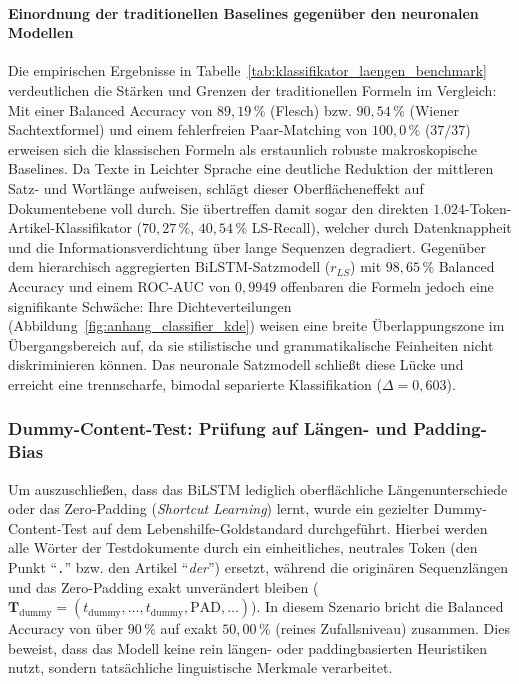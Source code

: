 \paragraph{Einordnung der traditionellen Baselines gegenüber den neuronalen Modellen}
Die empirischen Ergebnisse in Tabelle~\ref{tab:klassifikator_laengen_benchmark} verdeutlichen die Stärken und Grenzen der traditionellen Formeln im Vergleich: Mit einer Balanced Accuracy von $89{,}19\,\%$ (Flesch) bzw. $90{,}54\,\%$ (Wiener Sachtextformel) und einem fehlerfreien Paar-Matching von $100{,}0\,\%$ ($37/37$) erweisen sich die klassischen Formeln als erstaunlich robuste makroskopische Baselines. Da Texte in Leichter Sprache eine deutliche Reduktion der mittleren Satz- und Wortlänge aufweisen, schlägt dieser Oberflächeneffekt auf Dokumentebene voll durch. Sie übertreffen damit sogar den direkten $1.024$-Token-Artikel-Klassifikator ($70{,}27\,\%$, $40{,}54\,\%$ LS-Recall), welcher durch Datenknappheit und die Informationsverdichtung über lange Sequenzen degradiert.
Gegenüber dem hierarchisch aggregierten BiLSTM-Satzmodell ($r_{LS}$) mit $98{,}65\,\%$ Balanced Accuracy und einem ROC-AUC von $0{,}9949$ offenbaren die Formeln jedoch eine signifikante Schwäche: Ihre Dichteverteilungen (Abbildung~\ref{fig:anhang_classifier_kde}) weisen eine breite Überlappungszone im Übergangsbereich auf, da sie stilistische und grammatikalische Feinheiten nicht diskriminieren können. Das neuronale Satzmodell schließt diese Lücke und erreicht eine trennscharfe, bimodal separierte Klassifikation ($\Delta = 0{,}603$).
\subsubsection{Dummy-Content-Test: Prüfung auf Längen- und Padding-Bias}
\label{sec:dummy_content_test}

Um auszuschließen, dass das BiLSTM lediglich oberflächliche Längenunterschiede oder das Zero-Padding (\textit{Shortcut Learning}) lernt, wurde ein gezielter Dummy-Content-Test auf dem Lebenshilfe-Goldstandard durchgeführt. Hierbei werden alle Wörter der Testdokumente durch ein einheitliches, neutrales Token (den Punkt \enquote{\texttt{.}} bzw. den Artikel \enquote{\textit{der}}) ersetzt, während die originären Sequenzlängen und das Zero-Padding exakt unverändert bleiben ($\mathbf{T}_{\text{dummy}} = (t_{\text{dummy}}, \dots, t_{\text{dummy}}, \text{PAD}, \dots)$). In diesem Szenario bricht die Balanced Accuracy von über $90\,\%$ auf exakt $50{,}00\,\%$ (reines Zufallsniveau) zusammen. Dies beweist, dass das Modell keine rein längen- oder paddingbasierten Heuristiken nutzt, sondern tatsächliche linguistische Merkmale verarbeitet.


